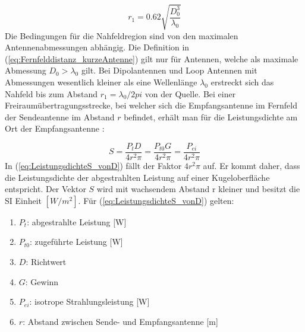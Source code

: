 \begin{equation}
r_{1}=0.62\sqrt{\dfrac{D_{0}^{3}}{\lambda_{0}}} \label{eq:Fernfelddistanz_kurzeAntenne}
\end{equation}
Die Bedingungen für die Nahfeldregion sind von den maximalen Antennenabmessungen abhängig. Die Definition in (\ref{eq:Fernfelddistanz_kurzeAntenne}) gilt nur für Antennen, welche als maximale Abmessung $D_{0}>\lambda_{0}$ gilt.
Bei Dipolantennen und Loop Antennen mit Abmessungen wesentlich kleiner als eine Wellenlänge $\lambda_{0}$ erstreckt sich das Nahfeld bis zum Abstand $r_{1}=\lambda_{0}/2pi$ von der Quelle. Bei einer Freiraumübertragungsstrecke, bei welcher sich die Empfangsantenne im Fernfeld der Sendeantenne im Abstand $r$ befindet, erhält man für die Leistungsdichte am Ort der Empfangsantenne \cite{meinke1992taschenbuch}:

\begin{equation}
S=\dfrac{P_{t}D}{4r^{2}\pi} = \dfrac{P_{t0}G}{4r^{2}\pi}=\dfrac{P_{ei}}{4r^{2}\pi}\label{eq:LeistungsdichteS_vonD}
\end{equation}
In (\ref{eq:LeistungsdichteS_vonD}) fällt der Faktor $4r^{2}\pi$ auf. Er kommt daher, dass die Leistungsdichte der abgestrahlten Leistung auf einer Kugeloberfläche entspricht. Der Vektor $S$ wird mit wachsendem Abstand r  kleiner und besitzt die SI Einheit $[W/m^{2}]$. Für (\ref {eq:LeistungsdichteS_vonD}) gelten:
\begin{enumerate}[leftmargin=2cm]
   \item[] $P_t$: abgestrahlte Leistung [W]
   \item[] $P_{t0}$: zugeführte Leistung [W]
	\item[] $D$: Richtwert 
   \item[] $G$: Gewinn 
   \item[] $P_{ei}$: isotrope Strahlungsleistung  [W] 
   \item[] $r$: Abstand zwischen Sende- und Empfangsantenne [m]
\end{enumerate} 





